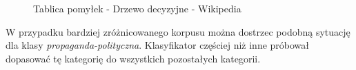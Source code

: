 % 
% 
\begin{figure}[ht!]
	\centering
    \qquad
	\caption{Tablica pomyłek - Drzewo decyzyjne - Wikipedia}
    \label{fig:c-matrix-dt-wikipedia}
\end{figure}
W przypadku bardziej zróżnicowanego korpusu można dostrzec podobną sytuację dla klasy \textit{propaganda-polityczna}. Klasyfikator częściej niż inne próbował dopasować tę kategorię do wszystkich pozostałych kategorii.

